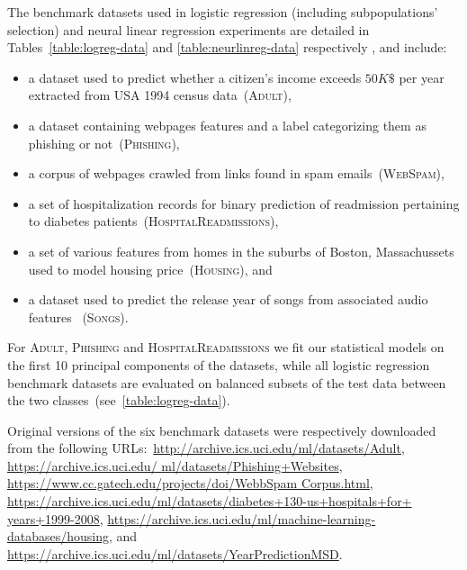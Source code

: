 The benchmark datasets used in logistic regression (including subpopulations' selection) and neural linear regression experiments are detailed in Tables~\ref{table:logreg-data} and \ref{table:neurlinreg-data} respectively%
, and include: 
\begin{itemize}
	\item a dataset used to predict whether a citizen's income exceeds $50K \$$ per year extracted from USA 1994 census data~(\textsc{Adult}),
	\item a dataset containing webpages features and a label categorizing them as phishing or not~(\textsc{Phishing}),
	\item a corpus of webpages crawled from links found in spam emails~(\textsc{WebSpam}),
	\item a set of hospitalization records for binary prediction of readmission pertaining to diabetes patients~(\textsc{HospitalReadmissions}),
	\item a set of various features from homes in the suburbs of Boston, Massachussets used to model housing price~(\textsc{Housing}), and
	\item a dataset used to predict the release year of songs from associated audio features ~(\textsc{Songs}).
\end{itemize} 

For \textsc{Adult}, \textsc{Phishing} and \textsc{HospitalReadmissions} we fit our statistical models on the first 10 principal components of the datasets, while  all logistic regression benchmark datasets are evaluated on balanced subsets of the test data between the two classes~(see~\cref{table:logreg-data}).

Original versions of the six benchmark datasets were respectively downloaded from the following URLs:~\href{http://archive.ics.uci.edu/ml/datasets/Adult}{http://archive.ics.uci.edu/ml/datasets/Adult},  \href{https://archive.ics.uci.edu/ml/datasets/Phishing+Websites}{https://archive.ics.uci.edu/ ml/datasets/Phishing+Websites}, \href{https://www.cc.gatech.edu/projects/doi/WebbSpamCorpus.html}{https://www.cc.gatech.edu/projects/doi/WebbSpam Corpus.html}, \href{https://archive.ics.uci.edu/ml/datasets/diabetes+130-us+hospitals+for+years+1999-2008}{https://archive.ics.uci.edu/ml/datasets/diabetes+130-us+hospitals+for+ years+1999-2008}, \href{https://archive.ics.uci.edu/ml/machine-learning-databases/housing}{https://archive.ics.uci.edu/ml/machine-learning-databases/housing}, and \href{https://archive.ics.uci.edu/ml/datasets/YearPredictionMSD}{https://archive.ics.uci.edu/ml/datasets/YearPredictionMSD}. 
